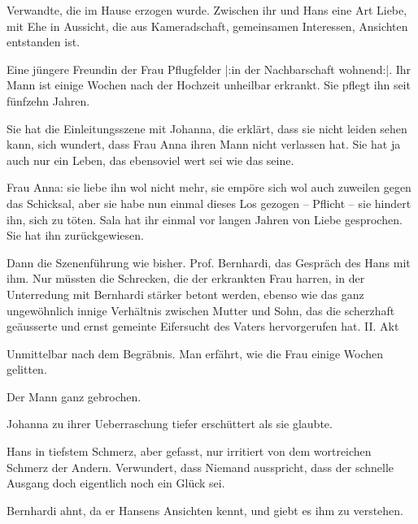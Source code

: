                Verwandte, die im Hause erzogen wurde. Zwischen ihr und Hans eine Art Liebe, mit Ehe
               in Aussicht, die aus Kameradschaft, gemeinsamen Interessen, Ansichten entstanden
               ist.\pend
           
\pstart
           Eine jüngere Freundin der Frau Pflugfelder |:in der Nachbarschaft wohnend:|. Ihr Mann
               ist einige Wochen nach der Hochzeit unheilbar erkrankt. Sie pflegt ihn seit fünfzehn
               Jahren.\pend
           
\pstart
           Sie hat die Einleitungsszene mit Johanna, die erklärt, dass sie nicht leiden sehen
               kann, sich wundert, dass Frau Anna ihren Mann nicht verlassen hat. Sie hat ja auch
               nur ein Leben, das ebensoviel wert sei wie das seine.\pend
           
\pstart
           Frau Anna: sie liebe ihn wol nicht mehr, sie empöre sich wol auch zuweilen gegen das
               Schicksal, aber sie habe nun einmal dieses Los gezogen – Pflicht – sie hindert ihn,
               sich zu töten. Sala hat ihr einmal vor langen Jahren von Liebe gesprochen. Sie hat
               ihn zurückgewiesen.\pend
           
\pstart
           {\pb}Dann die Szenenführung wie bisher. Prof.
               Bernhardi, das Gespräch des Hans mit ihm. Nur müssten die Schrecken, die der
               erkrankten Frau harren, in der Unterredung mit Bernhardi stärker betont werden,
               ebenso wie das ganz ungewöhnlich innige Verhältnis zwischen Mutter und Sohn, das die
               scherzhaft geäusserte und ernst gemeinte Eifersucht des Vaters hervorgerufen hat.\pend
           {\vspace{1\baselineskip}}
\pstart
           II. Akt\pend
           
\pstart
           Unmittelbar nach dem Begräbnis. Man erfährt, wie die Frau einige Wochen gelitten.\pend
           
\pstart
           Der Mann ganz gebrochen.\pend
           
\pstart
           Johanna zu ihrer Ueberraschung tiefer erschüttert als sie glaubte.\pend
           
\pstart
           Hans in tiefstem Schmerz, aber gefasst, nur irritiert von dem wortreichen Schmerz der
               Andern. Verwundert, dass Niemand ausspricht, dass der schnelle Ausgang doch
               eigentlich noch ein Glück sei.\pend
           
\pstart
           {\pb}Bernhardi ahnt, da er Hansens Ansichten kennt,
               und giebt es ihm zu verstehen.\pend
           
